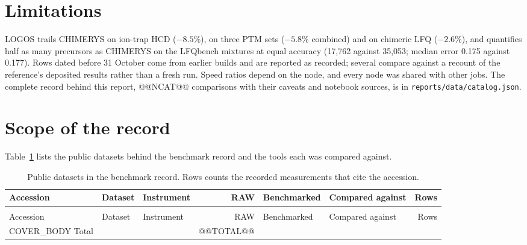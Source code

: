 \section{Limitations}
LOGOS trails CHIMERYS on ion-trap HCD ($-8.5$\%), on three PTM sets ($-5.8$\% combined) and on chimeric LFQ ($-2.6$\%), and quantifies half as many precursors as CHIMERYS on the LFQbench mixtures at equal accuracy (17,762 against 35,053; median error 0.175 against 0.177). Rows dated before 31 October come from earlier builds and are reported as recorded; several compare against a recount of the reference's deposited results rather than a fresh run. Speed ratios depend on the node, and every node was shared with other jobs. The complete record behind this report, @@NCAT@@ comparisons with their caveats and notebook sources, is in \texttt{reports/data/catalog.json}.

\section{Scope of the record}
Table~\ref{tab:cover} lists the public datasets behind the benchmark record and the tools each was compared against.

{\scriptsize\setlength{\tabcolsep}{3pt}
\begin{longtable}{@{}>{\raggedright\arraybackslash}m{1.05in} >{\raggedright\arraybackslash}m{1.2in} >{\raggedright\arraybackslash}m{0.75in} r >{\raggedright\arraybackslash}m{1.4in} >{\raggedright\arraybackslash}m{1.2in} r@{}}
\caption{Public datasets in the benchmark record. Rows counts the recorded measurements that cite the accession.}\label{tab:cover}\\
\toprule
Accession & Dataset & Instrument & RAW & Benchmarked & Compared against & Rows\\ \midrule
\endfirsthead
\multicolumn{7}{@{}l}{\small\textit{Table~\ref{tab:cover}, continued}}\\ \toprule
Accession & Dataset & Instrument & RAW & Benchmarked & Compared against & Rows\\ \midrule
\endhead
COVER_BODY
\midrule
Total & & & @@TOTAL@@ & & & \\
\bottomrule
\end{longtable}}
